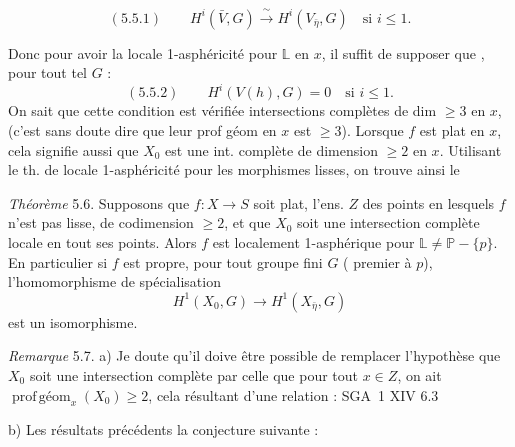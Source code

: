 \documentclass[11pt,a4paper]{article}
\begin{document}
\[
(5.5.1)\qquad H^i(\bar V, G) \xrightarrow{\ \sim\ } H^i(V_{\bar\eta}, G)
\quad \text{si } i \leq 1 .
\]


Donc pour avoir la locale 1-asphéricité pour $\mathbb{L}$ en $x$, il suffit de supposer
que , pour tout tel $G$ :
\[
(5.5.2)\qquad H^i(V(h), G) = 0 \quad \text{si } i \leq 1 .
\]
On sait \struck{\ill{}} que cette condition est vérifiée \struck{\ill{}} 
  intersections complètes de dim $\geq 3$ en $x$,
(c'est sans doute dire que leur prof géom en $x$ est $\geq 3$). Lorsque $f$ est plat en $x$,
cela signifie aussi que $X_0$ est une int. complète de dimension $\geq 2$ en $x$.
Utilisant le th. de locale 1-asphéricité pour les morphismes lisses, on trouve ainsi le

\emph{Théorème} 5.6. Supposons que $f : X \to S$ soit plat,  l'ens. $Z$
des points  en lesquels $f$ n'est pas lisse,  de codimension
$\geq 2$, et que $X_0$ soit une intersection complète locale en tout ses points. Alors $f$
est localement 1-asphérique pour  \struck{\ill{}}
$\mathbb{L} \neq \mathbb{P} - \{p\}$. En particulier si $f$ est propre, 
pour tout groupe fini $G$ ( premier à $p$), l'homomorphisme de
spécialisation
\[
H^1(X_0, G) \longrightarrow H^1(X_{\bar\eta}, G)
\]
est un isomorphisme.

\emph{Remarque} 5.7. a) Je doute qu'il doive être possible de remplacer l'hypothèse
que $X_0$ soit une intersection complète par celle que pour tout $x \in Z$, on ait
$\operatorname{prof\,géom}_x(X_0) \geq 2$, cela résultant d'une relation
 : SGA~1 XIV 6.3


b) Les résultats précédents  la conjecture suivante
 :
\end{document}
